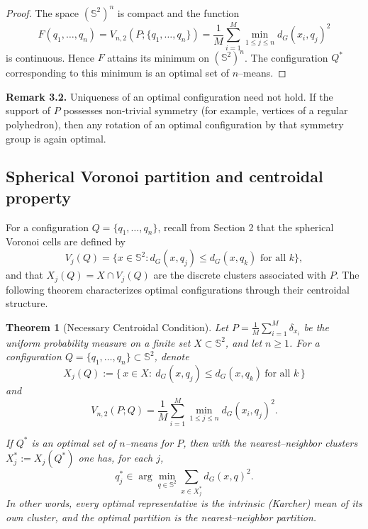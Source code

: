 \documentclass[12pt, reqno]{amsart}
\theoremstyle{plain}
\newtheorem{theorem}[subsection]{Theorem}
\theoremstyle{definition}
\newcommand{\D}[1]{\mathbb{#1}}%
\begin{document}
\begin{proof}
The space $(\D S^2)^n$ is compact and the function
\[
F( {q}_1, \ldots,  {q}_n)
= V_{n,2}(P; \{ {q}_1, \ldots,  {q}_n\})
= \frac{1}{M} \sum_{i=1}^M \min_{1 \le j \le n} d_G( {x}_i,  {q}_j)^2
\]
is continuous. Hence $F$ attains its minimum on $(\D S^2)^n$. The configuration $ {Q}^*$ corresponding to
this minimum is an optimal set of $n$--means. 
\end{proof}

\noindent\textbf{Remark 3.2.}
Uniqueness of an optimal configuration need not hold. If the support of $P$ possesses non-trivial symmetry
(for example, vertices of a regular polyhedron), then any rotation of an optimal configuration by that
symmetry group is again optimal.

\medskip

\subsection{Spherical Voronoi partition and centroidal property} For a configuration $ {Q} = \{ {q}_1, \ldots,  {q}_n\}$, recall
from Section 2 that the spherical Voronoi cells are defined by
\[
V_j( {Q}) = \{ {x} \in \D S^2 : d_G( {x},  {q}_j) \le d_G( {x},  {q}_k) \text{ for all } k\},
\]
and that $ {X}_j( {Q}) =  {X} \cap V_j( {Q})$ are the discrete clusters associated with $P$. The following theorem
characterizes optimal configurations through their centroidal structure.

\begin{theorem}[Necessary Centroidal Condition]\label{thm:char}
Let $P=\frac1M\sum_{i=1}^M \delta_{x_i}$ be the uniform probability measure on a finite set $X\subset \D S^2$, and let $n\ge1$. For a configuration $Q=\{q_1,\dots,q_n\}\subset \D S^2$, denote
\[
X_j(Q):=\{\,x\in X:\ d_G(x,q_j)\le d_G(x,q_k)\ \text{for all }k\,\}
\]
and
\[
V_{n,2}(P;Q)=\frac{1}{M}\sum_{i=1}^M \min_{1\le j\le n} d_G(x_i,q_j)^2.
\]

If $Q^\ast$ is an optimal set of $n$--means for $P$, then with the nearest--neighbor clusters
$X_j^\ast:=X_j(Q^\ast)$ one has, for each $j$,
\[
q_j^\ast \in \arg\min_{q\in \D S^2} \sum_{x\in X_j^\ast} d_G(x,q)^2.
\]
In other words, every optimal representative is the intrinsic (Karcher) mean of its own cluster, and the optimal partition is the nearest--neighbor partition.
\end{theorem}
\end{document}
